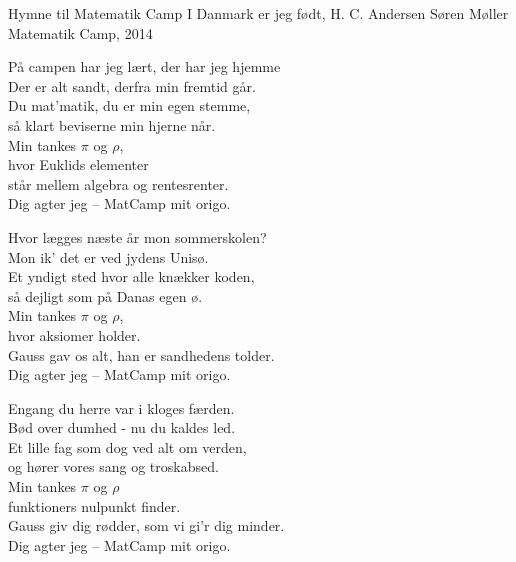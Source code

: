 \begin{song}{Hymne til Matematik Camp}
  {} %
  {I Danmark er jeg født, H. C. Andersen} %
  {Søren Møller} %
  {Matematik Camp, 2014} %
  {\NotCCLIed} %

  \begin{SBVerse}
    På campen har jeg lært, der har jeg hjemme\\
    Der er alt sandt, derfra min fremtid går.\\
    Du mat'matik, du er min egen stemme,\\
    så klart beviserne min hjerne når.\\\medskip
    Min tankes $\pi$ og $\rho$,\\
    hvor Euklids elementer\\
    står mellem algebra og rentesrenter.\\
    Dig agter jeg -- MatCamp mit origo.
  \end{SBVerse}

  \begin{SBVerse}
    Hvor lægges næste år mon sommerskolen?\\
    Mon ik' det er ved jydens Unisø.\\
    Et yndigt sted hvor alle knækker koden,\\
    så dejligt som på Danas egen ø.\\\medskip
    Min tankes $\pi$ og $\rho$,\\
    hvor aksiomer holder.\\
    Gauss gav os alt, han er sandhedens tolder.\\
    Dig agter jeg -- MatCamp mit origo.
  \end{SBVerse}

  \begin{SBVerse}
    Engang du herre var i kloges færden.\\
    Bød over dumhed - nu du kaldes led.\\
    Et lille fag som dog ved alt om verden,\\
    og hører vores sang og troskabsed.\\\medskip
    Min tankes $\pi$ og $\rho$\\
    funktioners nulpunkt finder.\\
    Gauss giv dig rødder, som vi gi'r dig minder.\\
    Dig agter jeg -- MatCamp mit origo.
  \end{SBVerse}


\end{song}
